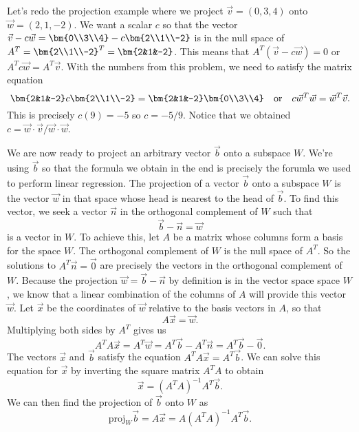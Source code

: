 \begin{example}
Let's redo the projection example where we project $\vec v = (0,3,4)$ onto $\vec w = (2,1,-2)$.  We want a scalar $c$ so that the vector $\vec v-c\vec w = \bm{0\\3\\4}-c\bm{2\\1\\-2}$ is in the null space of $A^T = \bm{2\\1\\-2}^T = \bm{2&1&-2}$. This means that $A^T (\vec v-c\vec w )=0$ or $A^T c\vec w = A^T \vec v$. With the numbers from this problem, we need to satisfy the matrix equation 
$$\bm{2&1&-2}c\bm{2\\1\\-2} = \bm{2&1&-2}\bm{0\\3\\4} \quad \text {or}\quad c\vec w^T\vec w = \vec w^T\vec v.$$
This is precisely $c (9) = -5$ so $c=-5/9$.  Notice that we obtained $c = \vec w\cdot \vec v/\vec w\cdot \vec w$.
\end{example}

We are now ready to project an arbitrary vector $\vec b$ onto a subspace $W$.  We're using $\vec b$ so that the formula we obtain in the end is precisely the forumla we used to perform linear regression. 
The projection of a vector $\vec b$ onto a subspace $W$ is the vector $\vec w$ in that space whose head is nearest to the head of $\vec b$. 
To find this vector, we seek a vector $\vec n$ in the orthogonal complement of $W$ such that $$\vec b-\vec n=\vec w$$ is a vector in $W$. 
To achieve this, let $A$ be a matrix whose columns form a basis for the space $W$.  
The orthogonal complement of $W$ is the null space of $A^T$.  
So the solutions to $A^T\vec n=\vec 0$ are precisely the vectors in the orthogonal complement of $W$. 
Because the projection $\vec w=\vec b-\vec n$ by definition is in the vector space space $W$, we know that a linear combination of the columns of $A$ will provide this vector $\vec w$.   
Let $\vec x$ be the coordinates of $\vec w$ relative to the basis vectors in $A$, so that 
$$A\vec x = \vec w.$$ 
Multiplying both sides by $A^T$ gives us $$A^T A \vec x = A^T\vec w =A^T\vec b - A^T\vec n = A^T\vec b - \vec 0.$$ 
The vectors $\vec x$ and $\vec b$ satisfy the equation $A^T A \vec x = A^T \vec b$. We can solve this equation for $\vec x$ by inverting the square matrix $A^TA$ to obtain $$\vec x = (A^TA)^{-1} A^T\vec b.$$
We can then find the projection of $\vec b$ onto $W$ as
$$\text{proj}_W\vec b = A\vec x = A (A^TA)^{-1} A^T\vec b.$$


